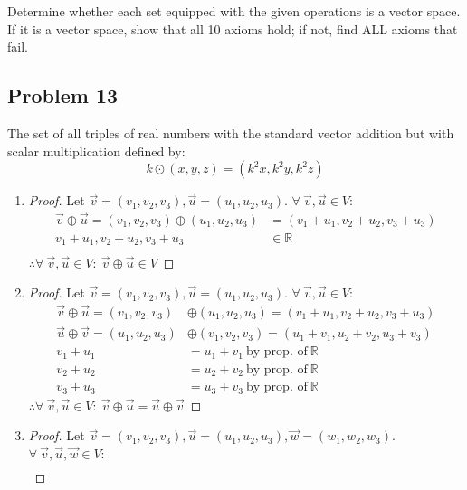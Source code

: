 \documentclass{article}
\newcommand{\bld}{\textbf}
\newcommand{\bb}{\mathbb}
\newcommand{\bitem}[1]{\item[\bld{#1.}]}
\begin{document}
Determine whether each set equipped with the given operations is a vector space.
If it is a vector space, show that all 10 axioms hold; if not, find ALL axioms that fail.

\subsection*{Problem 13}
The set of all triples of real numbers with the standard vector addition but with scalar multiplication defined by:
\[
  k \odot (x,y,z) = (k^2x,k^2y,k^2z)
\]
\begin{enumerate}
  \bitem{Axiom 1}
  \begin{proof}
    Let $\vec{v}=(v_1,v_2,v_3),\vec{u}=(u_1,u_2,u_3)$. $\forall~\vec{v},\vec{u} \in V$:
    \begin{align*}
      \vec{v} \oplus \vec{u} = (v_1,v_2,v_3) \oplus (u_1,u_2,u_3) & = (v_1+u_1,v_2+u_2,v_3+u_3) \\
      v_1+u_1,v_2+u_2,v_3+u_3                                     & \in \bb{R}                  \\
    \end{align*}
    $\therefore \forall~\vec{v},\vec{u} \in V:~\vec{v} \oplus \vec{u} \in V$
  \end{proof}
  \bitem{Axiom 2}
  \begin{proof}
    Let $\vec{v}=(v_1,v_2,v_3),\vec{u}=(u_1,u_2,u_3)$. $\forall~\vec{v},\vec{u} \in V$:
    \begin{align*}
      \vec{v} \oplus \vec{u} = (v_1,v_2,v_3) & \oplus (u_1,u_2,u_3) = (v_1+u_1,v_2+u_2,v_3+u_3) \\
      \vec{u} \oplus \vec{v} = (u_1,u_2,u_3) & \oplus (v_1,v_2,v_3) = (u_1+v_1,u_2+v_2,u_3+v_3) \\
      v_1+u_1                                & = u_1+v_1~\text{by prop. of}~\bb{R}              \\
      v_2+u_2                                & = u_2+v_2~\text{by prop. of}~\bb{R}              \\
      v_3+u_3                                & = u_3+v_3~\text{by prop. of}~\bb{R}
    \end{align*}
    $\therefore \forall~\vec{v},\vec{u} \in V:~\vec{v} \oplus \vec{u} = \vec{u} \oplus \vec{v}$
  \end{proof}
  \bitem{Axiom 3}
  \begin{proof}
    Let $\vec{v}=(v_1,v_2,v_3),\vec{u}=(u_1,u_2,u_3),\vec{w}=(w_1,w_2,w_3)$. $\forall~\vec{v},\vec{u},\vec{w} \in V$:
    \begin{align*}

\end{align*}
\end{proof}
\end{enumerate}
\end{document}
